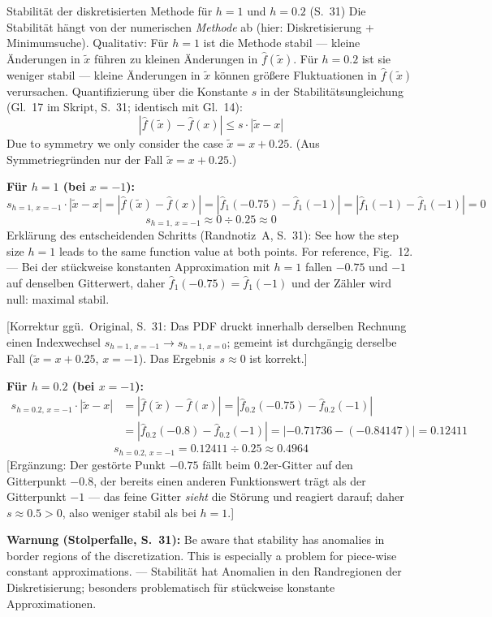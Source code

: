 \begin{bspbox}{Stabilität der diskretisierten Methode für $h=1$ und $h=0.2$ (S.~31)}
Die Stabilität hängt von der numerischen \emph{Methode} ab (hier: Diskretisierung + Minimumsuche). Qualitativ: Für $h=1$ ist die Methode stabil — kleine Änderungen in $\tilde{x}$ führen zu kleinen Änderungen in $\hat{f}(\tilde{x})$. Für $h=0.2$ ist sie weniger stabil — kleine Änderungen in $\tilde{x}$ können größere Fluktuationen in $\hat{f}(\tilde{x})$ verursachen. Quantifizierung über die Konstante $s$ in der Stabilitätsungleichung (Gl.~17 im Skript, S.~31; identisch mit Gl.~14):
\[ \left| \hat{f}(\tilde{x}) - \hat{f}(x) \right| \leq s \cdot |\tilde{x} - x| \tag{Gl.~17} \]
\glqq Due to symmetry we only consider the case $\tilde{x} = x + 0.25$.\grqq{} (Aus Symmetriegründen nur der Fall $\tilde{x} = x + 0.25$.)

\textbf{Für $h=1$ (bei $x=-1$):}
\[ s_{h=1,\,x=-1} \cdot |\tilde{x} - x| = \left| \hat{f}(\tilde{x}) - \hat{f}(x) \right| = \left| \hat{f}_1(-0.75) - \hat{f}_1(-1) \right| = \left| \hat{f}_1(-1) - \hat{f}_1(-1) \right| = 0 \]
\[ s_{h=1,\,x=-1} \approx 0 \div 0.25 \approx 0 \]
Erklärung des entscheidenden Schritts (Randnotiz~A, S.~31): \glqq See how the step size $h=1$ leads to the same function value at both points. For reference, Fig.~12.\grqq{} — Bei der stückweise konstanten Approximation mit $h=1$ fallen $-0.75$ und $-1$ auf denselben Gitterwert, daher $\hat{f}_1(-0.75) = \hat{f}_1(-1)$ und der Zähler wird null: maximal stabil.

[Korrektur ggü.\ Original, S.~31: Das PDF druckt innerhalb derselben Rechnung einen Indexwechsel $s_{h=1,\,x=-1} \to s_{h=1,\,x=0}$; gemeint ist durchgängig derselbe Fall ($\tilde{x} = x + 0.25$, $x = -1$). Das Ergebnis $s \approx 0$ ist korrekt.]

\textbf{Für $h=0.2$ (bei $x=-1$):}
\begin{align*}
s_{h=0.2,\,x=-1} \cdot |\tilde{x} - x| &= \left| \hat{f}(\tilde{x}) - \hat{f}(x) \right| = \left| \hat{f}_{0.2}(-0.75) - \hat{f}_{0.2}(-1) \right| \\
&= \left| \hat{f}_{0.2}(-0.8) - \hat{f}_{0.2}(-1) \right| = |-0.71736 - (-0.84147)| = 0.12411
\end{align*}
\[ s_{h=0.2,\,x=-1} = 0.12411 \div 0.25 \approx 0.4964 \]
[Ergänzung: Der gestörte Punkt $-0.75$ fällt beim $0.2$er-Gitter auf den Gitterpunkt $-0.8$, der bereits einen anderen Funktionswert trägt als der Gitterpunkt $-1$ — das feine Gitter \emph{sieht} die Störung und reagiert darauf; daher $s \approx 0.5 > 0$, also weniger stabil als bei $h=1$.]

\textbf{Warnung (Stolperfalle, S.~31):} \glqq Be aware that stability has anomalies in border regions of the discretization. This is especially a problem for piece-wise constant approximations.\grqq{} — Stabilität hat Anomalien in den Randregionen der Diskretisierung; besonders problematisch für stückweise konstante Approximationen.
\end{bspbox}

